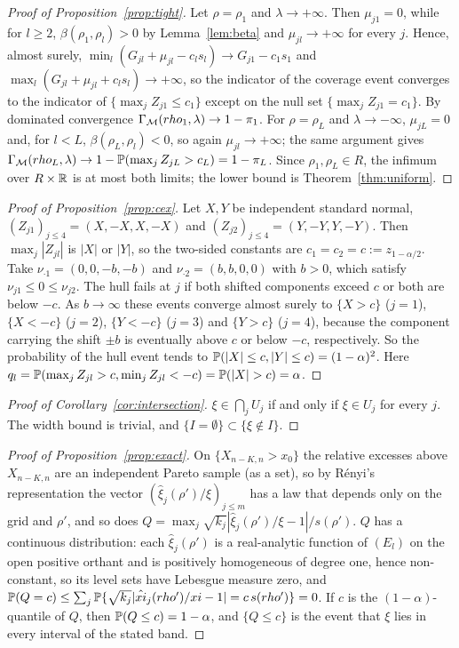\begin{proof}[Proof of Proposition~\ref{prop:tight}]
Let $\rho=\rho_1$ and $\lambda\to+\infty$. Then $\mu_{j1}=0$, while for $l\ge2$,
$\beta(\rho_1,\rho_l)>0$ by Lemma~\ref{lem:beta} and $\mu_{jl}\to+\infty$ for every $j$. Hence,
almost surely, $\min_l(G_{jl}+\mu_{jl}-c_ls_l)\to G_{j1}-c_1s_1$ and
$\max_l(G_{jl}+\mu_{jl}+c_ls_l)\to+\infty$, so the indicator of the coverage event converges to
the indicator of $\{\max_jZ_{j1}\le c_1\}$ except on the null set $\{\max_jZ_{j1}=c_1\}$. By
dominated convergence $\Gamma_{\mathcal{M}}(rho_1,\lambda)\to1-\pi_1$. For $\rho=\rho_L$ and
$\lambda\to-\infty$, $\mu_{jL}=0$ and, for $l<L$, $\beta(\rho_L,\rho_l)<0$, so again $\mu_{jl}\to+\infty$;
the same argument gives $\Gamma_{\mathcal{M}}(rho_L,\lambda)\to1-\mathbb{P}(\max_jZ_{jL}>c_L)=1-\pi_L$. Since
$\rho_1,\rho_L\in R$, the infimum over $R\times\mathbb{R}$ is at most both limits; the lower bound is
Theorem~\ref{thm:uniform}. \qedhere
\end{proof}

\begin{proof}[Proof of Proposition~\ref{prop:cex}]
Let $X,Y$ be independent standard normal, $(Z_{j1})_{j\le4}=(X,-X,X,-X)$ and
$(Z_{j2})_{j\le4}=(Y,-Y,Y,-Y)$. Then $\max_j|Z_{jl}|$ is $|X|$ or $|Y|$, so the two-sided constants
are $c_1=c_2=c:=z_{1-\alpha/2}$. Take $\nu_{\cdot1}=(0,0,-b,-b)$ and $\nu_{\cdot2}=(b,b,0,0)$ with
$b>0$, which satisfy $\nu_{j1}\le0\le\nu_{j2}$. The hull fails at $j$ if both shifted components
exceed $c$ or both are below $-c$. As $b\to\infty$ these events converge almost surely to
$\{X>c\}$ ($j=1$), $\{X<-c\}$ ($j=2$), $\{Y<-c\}$ ($j=3$) and $\{Y>c\}$ ($j=4$), because the
component carrying the shift $\pm b$ is eventually above $c$ or below $-c$, respectively. So the
probability of the hull event tends to $\mathbb{P}(|X|\le c,|Y|\le c)=(1-\alpha)^2$. Here
$q_l=\Prob(\max_jZ_{jl}>c,\min_jZ_{jl}<-c)=\Prob(|X|>c)=\alpha$. \qedhere
\end{proof}

\begin{proof}[Proof of Corollary~\ref{cor:intersection}]
$\xi\in\bigcap_jU_j$ if and only if $\xi\in U_j$ for every $j$. The width bound is trivial, and
$\{I=\emptyset\}\subset\{\xi\notin I\}$. \qedhere
\end{proof}

\begin{proof}[Proof of Proposition~\ref{prop:exact}]
On $\{X_{n-K,n}>x_0\}$ the relative excesses above $X_{n-K,n}$ are an independent Pareto sample
(as a set), so by R\'enyi's representation the vector $(\hat\xi_j(\rho')/\xi)_{j\le m}$ has a law
that depends only on the grid and $\rho'$, and so does
$Q=\max_j\sqrt{k_j}|\hat\xi_j(\rho')/\xi-1|/s(\rho')$. $Q$ has a continuous distribution: each $\hat\xi_j(\rho')$ is a real-analytic function of $(E_l)$ on the open positive orthant and is positively homogeneous of degree one, hence non-constant, so its level sets have Lebesgue measure zero, and $\mathbb{P}(Q=c)\le\sum_j\mathbb{P}\{\sqrt{k_j}|\hat{xi}_j(rho')/xi-1|=c\,s(rho')\}=0$. If $c$ is the $(1-\alpha)$-quantile of $Q$,
then $\mathbb{P}(Q\le c)=1-\alpha$, and $\{Q\le c\}$ is the event that $\xi$ lies in every interval of
the stated band. \qedhere
\end{proof}

